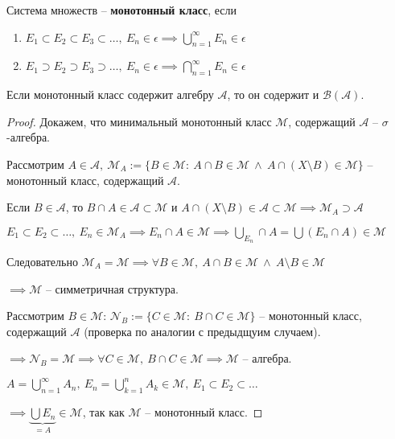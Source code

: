 \begin{definition}
    Система множеств  -- \textbf{монотонный класс}, если 

    \begin{enumerate}
        \item $E_1 \subset E_2 \subset E_3 \subset \dots, \ E_n \in \epsilon \implies \bigcup_{n=1}^{\infty} E_n \in \epsilon$
        \item $E_1 \supset E_2 \supset E_3 \supset \dots, \ E_n \in \epsilon \implies \bigcap_{n=1}^{\infty} E_n \in \epsilon$
    \end{enumerate}
\end{definition}

\begin{theorem}
    Если монотонный класс содержит алгебру $\mathcal{A}$, то он содержит и $\mathcal{B} (\mathcal{A})$.
\end{theorem}
\begin{proof}
    Докажем, что минимальный монотонный класс $\mathcal{M}$, содержащий $\mathcal{A}$ -- $\sigma$-алгебра.

    Рассмотрим $A \in \mathcal{A}, \ \mathcal{M}_{A} := \{ B \in \mathcal{M} : \ A \cap B \in \mathcal{M} \ \land \ A \cap (X \setminus B) \in \mathcal{M} \}$ -- монотонный класс, содержащий $\mathcal{A}$.

    Если $B \in \mathcal{A}$, то $B \cap A \in \mathcal{A} \subset \mathcal{M}$ и $A \cap (X \setminus B) \in \mathcal{A} \subset \mathcal{M} \implies \mathcal{M}_A \supset \mathcal{A}$

    $E_1 \subset E_2 \subset \dots, \ E_n \in \mathcal{M}_A \implies E_n \cap A \in \mathcal{M} \implies \bigcup_{E_n} \cap A = \bigcup(E_n \cap A) \in \mathcal{M}$

    Следовательно $\mathcal{M}_{A} = \mathcal{M} \implies \forall B \in \mathcal{M}, \ A \cap B \in \mathcal{M} \ \land \ A \setminus B \in \mathcal{M}$

    $\implies \mathcal{M}$ -- симметричная структура.
    
    Рассмотрим $B \in \mathcal{M}$: $\mathcal{N}_B := \{ C \in \mathcal{M}: \ B \cap C \in \mathcal{M} \}$ -- монотонный класс, содержащий $\mathcal{A}$ (проверка по аналогии с предыдщуим случаем).

    $\implies \mathcal{N}_B = \mathcal{M} \implies \forall C \in \mathcal{M}, \ B \cap C \in \mathcal{M} \implies \mathcal{M}$ -- алгебра. 

    $A = \bigcup_{n=1}^{\infty} A_n, \ E_n = \bigcup_{k=1}^{n} A_k \in \mathcal{M}, \ E_1 \subset E_2 \subset \dots$

    $\implies \underbrace{\bigcup E_n}_{= A} \in \mathcal{M}$, так как $\mathcal{M}$ -- монотонный класс.
\end{proof}

